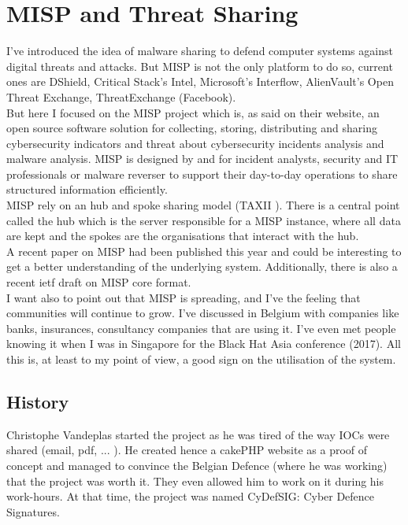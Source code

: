 \documentclass{eplmastersthesis}
\begin{document}
\section{MISP and Threat Sharing}
I've introduced the idea of malware sharing to defend computer systems against digital threats and attacks. But MISP is not the only platform to do so, current ones are DShield, Critical Stack’s Intel, Microsoft’s Interflow, AlienVault’s Open Threat Exchange, ThreatExchange (Facebook).\\
But here I focused on the MISP project which is, as said on their website, an open source software solution for collecting, storing, distributing and sharing cybersecurity indicators and threat about cybersecurity incidents analysis and malware analysis. MISP is designed by and for incident analysts, security and IT professionals or malware reverser to support their day-to-day operations to share structured information efficiently.\\
MISP rely on an hub and spoke sharing model (TAXII \cite{taxiiWebsite}). There is a central point called the hub which is the server responsible for a MISP instance, where all data are kept and the spokes are the organisations that interact with the hub.\\
A recent paper on MISP \cite{wagner2016misp} had been published this year and could be interesting to get a better understanding of the underlying system. Additionally, there is also a recent ietf draft on MISP core format\cite{MispDraft}.\\
I want also to point out that MISP is spreading, and I've the feeling that communities will continue to grow. I've discussed in Belgium with companies like banks, insurances, consultancy companies that are using it. I've even met people knowing it when I was in Singapore for the Black Hat Asia conference (2017). All this is, at least to my point of view, a good sign on the utilisation of the system.

\subsection{History}
Christophe Vandeplas started the project as he was tired of the way IOCs were shared (email, pdf, ... ). He created hence a cakePHP website as a proof of concept and managed to convince the Belgian Defence (where he was working) that the project was worth it. They even allowed him to work on it during his work-hours. At that time, the project was named CyDefSIG: Cyber Defence Signatures.\\
\end{document}
